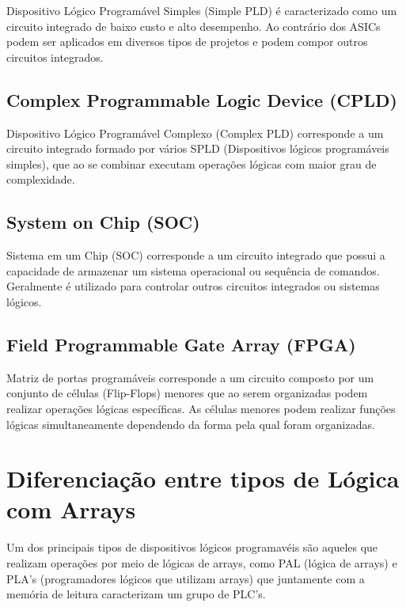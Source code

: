 Dispositivo Lógico Programável Simples (Simple PLD) é caracterizado como um circuito integrado de baixo custo e alto desempenho. Ao contrário dos ASICs podem ser aplicados em diversos tipos de projetos e podem compor outros circuitos integrados.

\subsection{\esp Complex Programmable Logic Device (CPLD)}

Dispositivo Lógico Programável Complexo (Complex PLD) corresponde a um circuito integrado formado por vários SPLD (Dispositivos lógicos programáveis simples), que ao se combinar executam operações lógicas com maior grau de complexidade.

\subsection{\esp System on Chip (SOC)}
Sistema em um Chip (SOC) corresponde a um circuito integrado que possui a capacidade de armazenar um sistema operacional ou sequência de comandos. Geralmente é utilizado para controlar outros circuitos integrados ou sistemas lógicos.

\subsection{\esp Field Programmable Gate Array (FPGA)}

Matriz de portas programáveis corresponde a um circuito composto por um conjunto de células (Flip-Flops) menores que ao serem organizadas podem realizar operações lógicas específicas. As células menores podem realizar funções lógicas simultaneamente dependendo da forma pela qual foram organizadas.


 
 

\section{\esp Diferenciação entre tipos de Lógica com Arrays}
    
    Um dos principais tipos de dispositivos lógicos programavéis são aqueles que realizam operações por meio de lógicas de arrays, como PAL (lógica de arrays) e PLA's (programadores lógicos que utilizam arrays) que juntamente com a memória de leitura caracterizam um grupo de PLC's.
    
